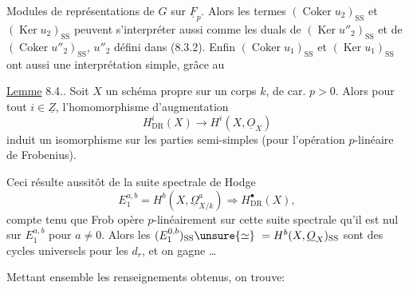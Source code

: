 
 Modules de représentations de $G$ sur $\underline F_p$. Alors les termes $(\operatorname{Coker}u_2)_{\mathrm{SS}}$ et $(\operatorname{Ker}u_2)_{\mathrm{SS}}$ peuvent s'interpréter aussi comme les duals de $(\operatorname{Ker}u''_2)_{\mathrm{SS}}$ et de $(\operatorname{Coker}u''_2)_{\mathrm{SS}}$, $u''_2$ défini dans (8.3.2). Enfin  $(\operatorname{Coker}u_1)_{\mathrm{SS}}$ et $(\operatorname{Ker}u_1)_{\mathrm{SS}}$ ont aussi une interprétation simple, grâce au

\uline{Lemme} 8.4.. Soit $X$ un schéma propre sur un corps $k$, de car. $p>0$. Alors pour tout $i\in\underline Z$, l'homomorphisme d'augmentation 
\[
H^i_{\mathrm{DR}}(X)\longrightarrow H^i(X,\underline O_X)
\]
induit un isomorphisme sur les parties semi-simples (pour l'opération $p$-linéaire de Frobenius).

Ceci résulte aussitôt de la suite spectrale de Hodge
\[
E_1^{a,b}=H^b(X,\underline\Omega^a_{X/k})\Longrightarrow H^\bullet_{\mathrm{DR}}(X),
\]
compte tenu que Frob opère  $p$-linéairement sur cette suite spectrale  qu'il est nul sur $E_1^{a,b}$ pour $a\ne0$. Alors les $(E_1^{0,b})_{\mathrm{SS}}\unsure{\simeq}\ =H^b(X,\underline O_X)_{\mathrm{SS}}$ sont des cycles universels pour les $d_r$, et on gagne \ldots
{}

Mettant ensemble les renseignements obtenus, 
on trouve:

